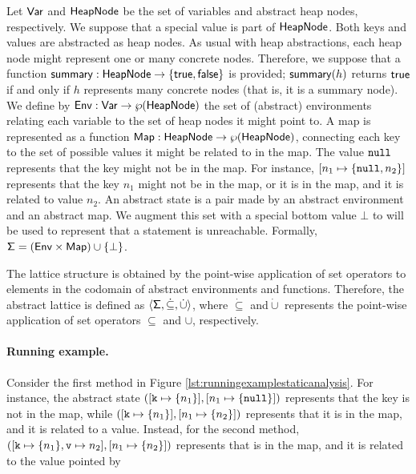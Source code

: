 Let $\mathsf{Var}$ and $\mathsf{HeapNode}$ be the set of variables and abstract heap nodes, respectively. We suppose that a special  value is part of $\mathsf{HeapNode}$. Both keys and values are abstracted as heap nodes. As usual with heap abstractions, each heap node might represent one or many concrete nodes. Therefore, we suppose that a function $\mathsf{summary} : \mathsf{HeapNode} \to \{\mathsf{true}, \mathsf{false}\}$ is provided; $\mathsf{summary}(h)$ returns $\mathsf{true}$ if and only if $h$ represents many concrete nodes (that is, it is a summary node). We define by $\mathsf{Env} : \mathsf{Var} \to \wp(\mathsf{HeapNode})$ the set of (abstract) environments relating each variable to the set of heap nodes it might point to. A map is represented as a function $\mathsf{Map} : \mathsf{HeapNode} \to \wp(\mathsf{HeapNode})$, connecting each key to the set of possible values it might be related to in the map. The value $\mathtt{null}$ represents that the key might not be in the map. For instance, $[n_1 \mapsto \{\mathtt{null}, n_2\}]$ represents that the key $n_1$ might not be in the map, or it is in the map, and it is related to value $n_2$. An abstract state is a pair made by an abstract environment and an abstract map. We augment this set with a special bottom value $\bot$ to will be used to represent that a statement is unreachable. Formally, $\mathsf{\Sigma} = (\mathsf{Env} \times \mathsf{Map}) \cup \{\bot\}$.

The lattice structure is obtained by the point-wise application of set operators to elements in the codomain of abstract environments and functions. Therefore, the abstract lattice is defined as $\langle \mathsf{\Sigma}, \dot{\subseteq}, \dot{\cup} \rangle$, where $\dot{\subseteq}$ and$\dot{\cup}$ represents the point-wise application of set operators $\subseteq$ and $\cup$, respectively.

\paragraph{Running example.} 
Consider the first method in Figure \ref{lst:runningexamplestaticanalysis}. For instance, the abstract state $([\mathtt{k} \mapsto \{n_1\}], [n_1 \mapsto \{\mathtt{null}\}])$ represents that the key  is not in the map, while $([\mathtt{k} \mapsto \{n_1\}], [n_1 \mapsto \{n_2\}])$ represents that it is in the map, and it is related to a value. Instead, for the second method, $([\mathtt{k} \mapsto \{n_1\}, \mathtt{v} \mapsto n_2], [n_1 \mapsto \{n_2\}])$ represents that  is in the map, and it is related to the value pointed by 


